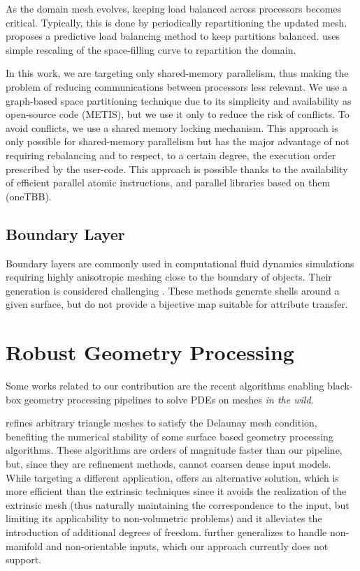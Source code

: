 As the domain mesh evolves, keeping load balanced across processors becomes
critical. Typically, this is done by periodically repartitioning the updated mesh.
\citet{zhou2012tools} proposes a predictive load balancing method to keep
partitions balanced. \citet{marot2019one} uses simple rescaling of the
space-filling curve to repartition the domain.

In this work, we are targeting only shared-memory parallelism, thus making the problem of reducing communications between processors less relevant. We use a graph-based space partitioning technique \cite{karypis1998fast} due to its simplicity and availability as open-source code (METIS), but we use it only to reduce the risk of conflicts. To avoid conflicts, we use a shared memory locking mechanism. This approach is only possible for shared-memory parallelism but has the major advantage of not requiring rebalancing and to respect, to a certain degree, the execution order prescribed by the user-code. This approach is possible thanks to the availability of efficient parallel atomic instructions, and parallel libraries based on them (oneTBB).


\subsection{Boundary Layer}

Boundary layers are commonly used in computational fluid dynamics simulations requiring highly anisotropic meshing close to the boundary of objects. Their generation is considered challenging \cite{aubry2015most,aubry2017boundary,garimella2000boundary}. These methods generate shells around a given surface, but do not provide a bijective map suitable for attribute transfer.

\section{Robust Geometry Processing}

Some works related to our contribution are the recent algorithms enabling black-box geometry processing pipelines to solve PDEs on meshes \emph{in the wild}. 

\cite{dyer2007delaunay,liu2015efficient} refines arbitrary triangle meshes to satisfy the Delaunay mesh condition,
benefiting the numerical stability of some surface based geometry processing algorithms.
These algorithms are orders of magnitude faster than our pipeline, but, since they are refinement methods, cannot coarsen dense input models.
%
While targeting a different application, \cite{sharp2019navigating} offers an alternative solution, 
which is more efficient than the extrinsic techniques \cite{liu2015efficient} since it avoids the realization of the extrinsic mesh (thus naturally maintaining the correspondence to the input, but limiting its applicability to non-volumetric problems) and it alleviates the introduction of additional degrees of freedom.
\cite{Sharp:2020:LNT} further generalizes \cite{sharp2019navigating} to handle non-manifold and non-orientable inputs, which our approach currently does not support.


